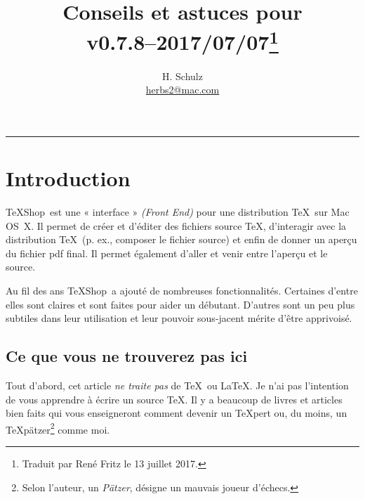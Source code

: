 \documentclass[11pt,french]{article}
\title{Conseils et astuces pour \TS\\\small v0.7.8--2017/07/07\thanks{Traduit par René Fritz le 13 juillet 2017.}}
\author{H. Schulz\\\small\href{mailto:herbs2@mac.com}{herbs2@mac.com}}
\date{}
\newcommand{\TS}{\textsf{\TeX Shop}}
\newcommand{\acr}[1]{\textsf{#1}}
\begin{document}
\maketitle

\tableofcontents

\begin{center}
\rule{0.5\textwidth}{1pt}
\end{center}

\section{Introduction}



\TS\ est une « interface » \emph{(Front End)} pour une distribution \TeX\ sur Mac OS~X. Il permet de créer et d'éditer des fichiers source \TeX{}, d'interagir avec la distribution \TeX\ (p. ex., composer le fichier source) et enfin de donner un aperçu du fichier \acr{pdf} final. Il permet également d'aller et venir entre l'aperçu et le source.


Au fil des ans \TS\ a ajouté de nombreuses fonctionnalités. Certaines d'entre elles sont claires et sont faites pour aider un débutant. D'autres sont un peu plus subtiles dans leur utilisation et leur pouvoir sous-jacent mérite d'être apprivoisé.


\subsection{Ce que vous ne trouverez pas ici}

Tout d'abord, cet article \emph{ne traite pas} de \TeX\ ou \LaTeX. Je n'ai pas l'intention de vous apprendre à écrire un source \TeX{}. Il y a beaucoup de livres et articles bien faits qui vous enseigneront comment devenir un \TeX pert ou, du moins, un \TeX pätzer\footnote{Selon l'auteur, un \emph{Pätzer}, désigne un mauvais joueur d'échecs.} comme moi.
 
\end{document}
